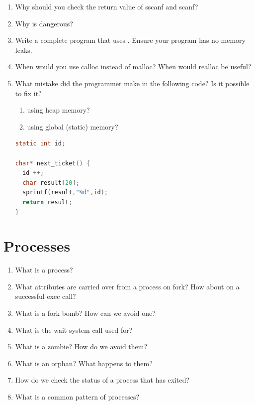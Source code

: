 \begin{enumerate}
\item Why should you check the return value of sscanf and scanf?

\item Why is  dangerous?

\item Write a complete program that uses . Ensure your program has no memory leaks.

\item When would you use calloc instead of malloc? When would realloc be useful?

\item What mistake did the programmer make in the following code? Is it possible to fix it?

\begin{enumerate}
\item using heap memory?
\item using global (static) memory?
\end{enumerate}

\begin{lstlisting}[language=C]
static int id;

char* next_ticket() {
  id ++;
  char result[20];
  sprintf(result,"%d",id);
  return result;
}
\end{lstlisting}

\end{enumerate}

\section{Processes}

\begin{enumerate}
\item What is a process?
\item What attributes are carried over from a process on fork? How about on a successful exec call?
\item What is a fork bomb? How can we avoid one?
\item What is the wait system call used for?
\item What is a zombie? How do we avoid them?
\item What is an orphan? What happens to them?
\item How do we check the status of a process that has exited?
\item What is a common pattern of processes?
\end{enumerate}

